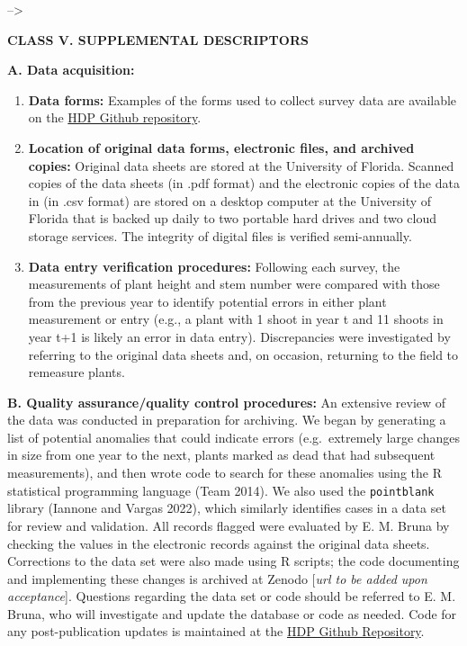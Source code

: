 \documentclass[
  12pt,
  man, donotrepeattitle,floatsintext]{apa6}
\begin{document}
--\textgreater{}

\noindent
\textbf{CLASS V. SUPPLEMENTAL DESCRIPTORS}

\noindent  
\textbf{A. Data acquisition:}

\begin{enumerate}
\def\labelenumi{\arabic{enumi}.}
\item
  \textbf{Data forms:} Examples of the forms used to collect survey data are available on the \href{https://github.com/BrunaLab/HeliconiaSurveys}{HDP Github repository}.
\item
  \textbf{Location of original data forms, electronic files, and archived copies:} Original data sheets are stored at the University of Florida. Scanned copies of the data sheets (in .pdf format) and the electronic copies of the data in (in .csv format) are stored on a desktop computer at the University of Florida that is backed up daily to two portable hard drives and two cloud storage services. The integrity of digital files is verified semi-annually.
\item
  \textbf{Data entry verification procedures:} Following each survey, the measurements of plant height and stem number were compared with those from the previous year to identify potential errors in either plant measurement or entry (e.g., a plant with 1 shoot in year t and 11 shoots in year t+1 is likely an error in data entry). Discrepancies were investigated by referring to the original data sheets and, on occasion, returning to the field to remeasure plants.
\end{enumerate}

\noindent
\textbf{B. Quality assurance/quality control procedures:} An extensive review of the data was conducted in preparation for archiving. We began by generating a list of potential anomalies that could indicate errors (e.g.~extremely large changes in size from one year to the next, plants marked as dead that had subsequent measurements), and then wrote code to search for these anomalies using the R statistical programming language (Team 2014). We also used the \texttt{pointblank} library (Iannone and Vargas 2022), which similarly identifies cases in a data set for review and validation. All records flagged were evaluated by E. M. Bruna by checking the values in the electronic records against the original data sheets. Corrections to the data set were also made using R scripts; the code documenting and implementing these changes is archived at Zenodo {[}\emph{url to be added upon acceptance}{]}. Questions regarding the data set or code should be referred to E. M. Bruna, who will investigate and update the database or code as needed. Code for any post-publication updates is maintained at the \href{https://github.com/BrunaLab/HeliconiaSurveys}{HDP Github Repository}.
\end{document}
